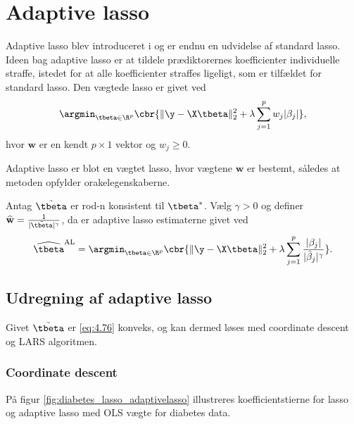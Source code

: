 \section{Adaptive lasso}
Adaptive lasso blev introduceret i \citep{adaptive_lasso} og er endnu en udvidelse af standard lasso.
Ideen bag adaptive lasso er at tildele prædiktorernes koefficienter individuelle straffe, istedet for at alle koefficienter straffes ligeligt, som er tilfældet for standard lasso.
Den vægtede lasso er givet ved
\begin{align*}
\argmin_{\tbeta \in \R^p} \cbr{\Vert \y - \X \tbeta \Vert_2^2 + \lambda \sum_{j=1}^p w_j \vert \beta_j \vert},
\end{align*}
hvor \(\mathbf{w}\) er en kendt \(p \times 1\) vektor og \(w_j \geq 0\).

Adaptive lasso er blot en vægtet lasso, hvor vægtene \(\mathbf{w}\) er bestemt, således at metoden opfylder orakelegenskaberne.
\begin{defn}
Antag \(\tilde{\tbeta}\) er rod-n konsistent til \(\tbeta^*\).
Vælg \(\gamma>0\) og definer \(\widehat{\mathbf{w}} = \frac{1}{\vert \tilde{\tbeta} \vert^\gamma}\), da er adaptive lasso estimaterne givet ved
\begin{align}
\widehat{\tbeta}^\text{AL} = \argmin_{\tbeta \in \R^p} \cbr{ \Vert \y - \X \tbeta \Vert_2^2 + \lambda \sum_{j=1}^p \frac{ \vert \beta_j \vert}{\vert \tilde{\beta}_j \vert^\gamma}}. \label{eq:4.76}
\end{align}
\end{defn}

\subsection{Udregning af adaptive lasso}
Givet \(\tilde{\tbeta}\) er \eqref{eq:4.76} konveks, og kan dermed løses med coordinate descent og LARS algoritmen.
\subsubsection{Coordinate descent}


På figur \ref{fig:diabetes_lasso_adaptivelasso} illustreres koefficientstierne for lasso og adaptive lasso med OLS vægte for diabetes data.

